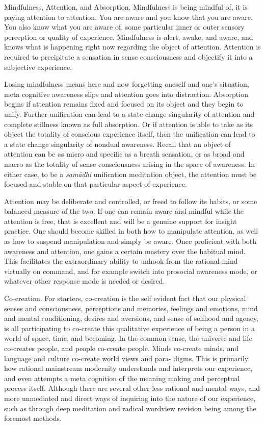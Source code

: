 \documentclass[12pt,openany]{book}
\begin{document}
Mindfulness, Attention, and Absorption. Mindfulness is being mindful of, it is paying attention to attention. You are aware and you know that you are aware. You also know what you are aware of, some particular inner or outer sensory perception or quality of experience. Mindfulness is alert, awake, and aware, and knows what is happening right now regarding the object of attention. Attention is required to precipitate a sensation in sense consciousness and objectify it into a subjective experience.

Losing mindfulness means here and now forgetting oneself and one’s situation, meta cognitive awareness slips and attention goes into distraction. Absorption begins if attention remains fixed and focused on its object and they begin to unify. Further unification can lead to a state change singularity of attention and complete stillness known as full absorption. Or if attention is able to take as its object the totality of conscious experience itself, then the unification can lead to a state change singularity of nondual awareness. Recall that an object of attention can be as micro and specific as a breath sensation, or as broad and macro as the totality of sense consciousness arising in the space of awareness. In either case, to be a \textit{samādhi} unification meditation object, the attention must be focused and stable on that particular aspect of experience.   

Attention may be deliberate and controlled, or freed to follow its habits, or some balanced measure of the two. If one can remain aware and mindful while the attention is free, that is excellent and will be a genuine support for insight practice. One should become skilled in both how to manipulate attention, as well as how to suspend manipulation and simply be aware. Once proficient with both awareness and attention, one gains a certain mastery over the habitual mind. This facilitates the extraordinary ability to unhook from the rational mind virtually on command, and for example switch into prosocial awareness mode, or whatever other response mode is needed or desired.

Co-creation. For starters, co-creation is the self evident fact that our physical senses and consciousness, perceptions and memories, feelings and emotions, mind and mental conditioning, desires and aversions, and sense of selfhood and agency, is all participating to co-create this qualitative experience of being a person in a world of space, time, and becoming. In the common sense, the universe and life co-creates people, and people co-create people. Minds co-create minds, and language and culture co-create world views and para- \linebreak digms. This is primarily how rational mainstream modernity understands and interprets our experience, and even attempts a meta cognition of the meaning making and perceptual process itself. Although there are several other less rational and mental ways, and more unmediated and direct ways of inquiring into the nature of our experience, such as through deep meditation and radical wordview revision being among the foremost methods.    
\end{document}
